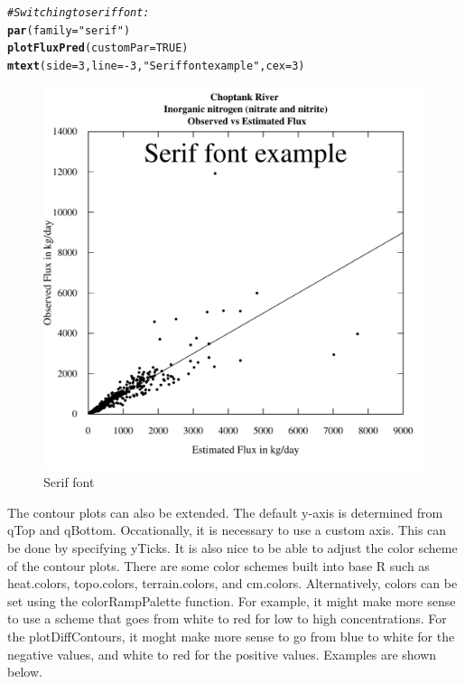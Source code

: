 \documentclass[a4paper,11pt]{article}\usepackage[]{graphicx}\usepackage[]{color}
\makeatletter
\newcommand{\hlnum}[1]{\textcolor[rgb]{0.686,0.059,0.569}{#1}}%
\newcommand{\hlstr}[1]{\textcolor[rgb]{0.192,0.494,0.8}{#1}}%
\newcommand{\hlcom}[1]{\textcolor[rgb]{0.678,0.584,0.686}{\textit{#1}}}%
\newcommand{\hlopt}[1]{\textcolor[rgb]{0,0,0}{#1}}%
\newcommand{\hlstd}[1]{\textcolor[rgb]{0.345,0.345,0.345}{#1}}%
\newcommand{\hlkwc}[1]{\textcolor[rgb]{0.333,0.667,0.333}{#1}}%
\newcommand{\hlkwd}[1]{\textcolor[rgb]{0.737,0.353,0.396}{\textbf{#1}}}%
\newenvironment{kframe}{%
 \def\at@end@of@kframe{}%
 \ifinner\ifhmode%
  \def\at@end@of@kframe{\end{minipage}}%
  \begin{minipage}{\columnwidth}%
 \fi\fi%
 \def\FrameCommand##1{\hskip\@totalleftmargin \hskip-\fboxsep
 \colorbox{shadecolor}{##1}\hskip-\fboxsep
     \hskip-\linewidth \hskip-\@totalleftmargin \hskip\columnwidth}%
 \MakeFramed {\advance\hsize-\width
   \@totalleftmargin\z@ \linewidth\hsize
   \@setminipage}}%
 {\par\unskip\endMakeFramed%
 \at@end@of@kframe}
\newenvironment{knitrout}{}{} %
\makeatother
\begin{document}
\begin{knitrout}
\color{fgcolor}\begin{kframe}
\begin{alltt}
\hlcom{# Switching to serif font:}
\hlkwd{par}\hlstd{(}\hlkwc{family}\hlstd{=}\hlstr{"serif"}\hlstd{)}
\hlkwd{plotFluxPred}\hlstd{(}\hlkwc{customPar}\hlstd{=}\hlnum{TRUE}\hlstd{)}
\hlkwd{mtext}\hlstd{(}\hlkwc{side}\hlstd{=}\hlnum{3}\hlstd{,}\hlkwc{line}\hlstd{=}\hlopt{-}\hlnum{3}\hlstd{,}\hlstr{"Serif font example"}\hlstd{,}\hlkwc{cex}\hlstd{=}\hlnum{3}\hlstd{)}
\end{alltt}
\end{kframe}\begin{figure}[]

\includegraphics[width=1\linewidth,height=1\linewidth]{figure/easyFontChange} \caption[Serif font]{Serif font\label{fig:easyFontChange}}
\end{figure}


\end{knitrout}


The contour plots can also be extended. The default y-axis is determined from qTop and qBottom. Occationally, it is necessary to use a custom axis. This can be done by specifying yTicks. It is also nice to be able to adjust the color scheme of the contour plots. There are some color schemes built into base R such as heat.colors, topo.colors, terrain.colors, and cm.colors. Alternatively, colors can be set using the colorRampPalette function. For example, it might make more sense to use a scheme that goes from white to red for low to high concentrations. For the plotDiffContours, it moght make more sense to go from blue to white for the negative values, and white to red for the positive values. Examples are shown below.
\end{document}
